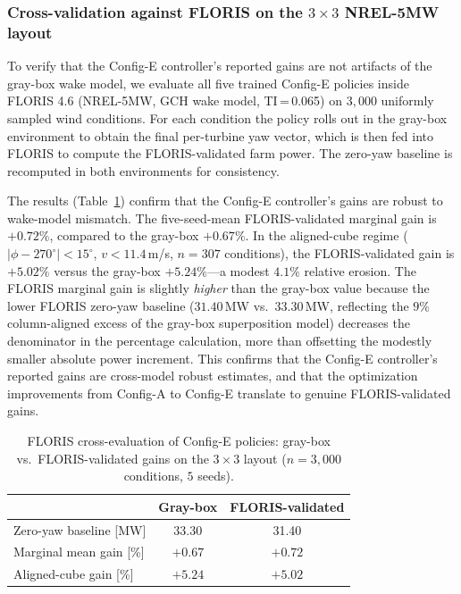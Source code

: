 \documentclass[final,5p,times]{elsarticle}
\begin{document}
\subsubsection{Cross-validation against FLORIS on the $3\!\times\!3$ NREL-5MW layout}\label{sec:floris_xval}

To verify that the Config-E controller's reported gains are not artifacts of the gray-box wake model, we evaluate all five trained Config-E policies inside FLORIS 4.6 (NREL-5MW, GCH wake model, TI\,=\,0.065) on $3{,}000$ uniformly sampled wind conditions. For each condition the policy rolls out in the gray-box environment to obtain the final per-turbine yaw vector, which is then fed into FLORIS to compute the FLORIS-validated farm power. The zero-yaw baseline is recomputed in both environments for consistency.

The results (Table~\ref{tab:floris_cross}) confirm that the Config-E controller's gains are robust to wake-model mismatch. The five-seed-mean FLORIS-validated marginal gain is $+0.72\%$, compared to the gray-box $+0.67\%$. In the aligned-cube regime ($|\phi{-}270^\circ|{<}15^\circ$, $v{<}11.4$\,m/s, $n{=}307$ conditions), the FLORIS-validated gain is $\mathbf{+5.02\%}$ versus the gray-box $\mathbf{+5.24\%}$---a modest $4.1\%$ relative erosion. The FLORIS marginal gain is slightly \emph{higher} than the gray-box value because the lower FLORIS zero-yaw baseline ($31.40$\,MW vs.\ $33.30$\,MW, reflecting the $9\%$ column-aligned excess of the gray-box superposition model) decreases the denominator in the percentage calculation, more than offsetting the modestly smaller absolute power increment. This confirms that the Config-E controller's reported gains are cross-model robust estimates, and that the optimization improvements from Config-A to Config-E translate to genuine FLORIS-validated gains.

\begin{table}[t]
\centering
\caption{FLORIS cross-evaluation of Config-E policies: gray-box vs.\ FLORIS-validated gains on the $3\!\times\!3$ layout ($n{=}3{,}000$ conditions, $5$ seeds).}
\label{tab:floris_cross}
\small
\begin{tabular}{lcc}
\toprule
& Gray-box & FLORIS-validated \\
\midrule
Zero-yaw baseline [MW] & 33.30 & 31.40 \\
Marginal mean gain [\%] & $+0.67$ & $+0.72$ \\
Aligned-cube gain [\%] & $+5.24$ & $\mathbf{+5.02}$ \\
\bottomrule
\end{tabular}
\end{table}
\end{document}
